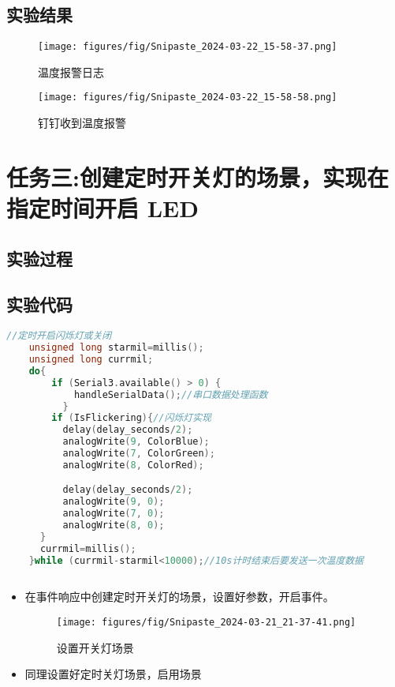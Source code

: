 \documentclass[12pt,hyperref,a4paper,UTF8]{ctexart}
\begin{document}
\subsection{实验结果}
\begin{figure}[H]
    \centering
    \texttt{[image: figures/fig/Snipaste\_2024-03-22\_15-58-37.png]}
    \caption{温度报警日志}
    \label{fig:enter-label}
\end{figure} 
\begin{figure}[H]
    \centering
    \texttt{[image: figures/fig/Snipaste\_2024-03-22\_15-58-58.png]}
    \caption{钉钉收到温度报警}
    \label{fig:enter-label}
\end{figure} 





\section{任务三:创建定时开关灯的场景，实现在指定时间开启 LED}
\subsection{实验过程}

\subsection*{实验代码}
    
\begin{lstlisting}[language=C++]
    //定时开启闪烁灯或关闭
    unsigned long starmil=millis();
    unsigned long currmil;
    do{
        if (Serial3.available() > 0) {
            handleSerialData();//串口数据处理函数
          }
        if (IsFlickering){//闪烁灯实现
          delay(delay_seconds/2);
          analogWrite(9, ColorBlue);
          analogWrite(7, ColorGreen);
          analogWrite(8, ColorRed);

          delay(delay_seconds/2);
          analogWrite(9, 0);
          analogWrite(7, 0);
          analogWrite(8, 0);   
      }
      currmil=millis();
    }while (currmil-starmil<10000);//10s计时结束后要发送一次温度数据
  
\end{lstlisting}


\begin{itemize}[itemsep=-5pt, topsep=0pt, partopsep=0pt]
    
    \item 在事件响应中创建定时开关灯的场景，设置好参数，开启事件。
    \begin{figure}[H]
        \centering
        \texttt{[image: figures/fig/Snipaste\_2024-03-21\_21-37-41.png]}
        \caption{设置开关灯场景}
        \label{fig:enter-label}
    \end{figure}
    \item 同理设置好定时关灯场景，启用场景
\end{itemize}
\end{document}
